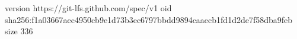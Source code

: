 version https://git-lfs.github.com/spec/v1
oid sha256:f1a03667aec4950cb9e1d73b3ec6797bbdd9894caaecb1fd1d2de7f58dba9feb
size 336

